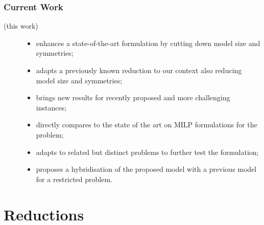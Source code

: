 \documentclass{beamer}
\newcommand{\currentsection}{}
\newcommand{\mysection}[1]{\renewcommand{\currentsection}{#1}\section{#1}}
\begin{document}
\begin{frame}[fragile]
\frametitle{Current Work}
\centering
\begin{description}
\item[(this work)] \begin{itemize}
\item enhances a state-of-the-art formulation by cutting down model size and symmetries;
\item adapts a previously known reduction to our context also reducing model size and symmetries;
\item brings new results for recently proposed and more challenging instances;
\item directly compares to the state of the art on MILP formulations for the problem;
\item adapts to related but distinct problems to further test the formulation;
\item proposes a hybridisation of the proposed model with a previous model for a restricted problem.
\end{itemize}
\end{description}
\end{frame}

\mysection{Reductions}
\end{document}
